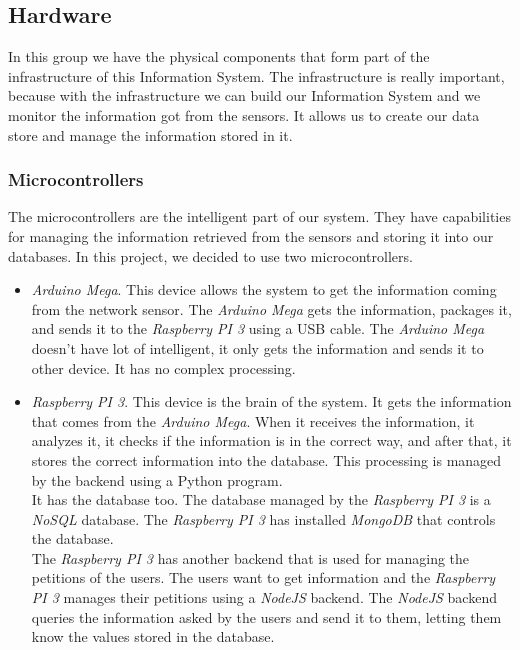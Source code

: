 \subsection{Hardware}

In this group we have the physical components that form part of the infrastructure of this Information System. The infrastructure is really important, because with the infrastructure we can build our Information System and we monitor the information got from the sensors. It allows us to create our data store and manage the information stored in it.

\subsubsection{Microcontrollers}

The microcontrollers are the intelligent part of our system. They have capabilities for managing the information retrieved from the sensors and storing it into our databases. In this project, we decided to use two microcontrollers.

\begin{itemize}

\item \textit{Arduino Mega}. This device allows the system to get the information coming from the network sensor. The \textit{Arduino Mega} gets the information, packages it, and sends it to the \textit{Raspberry PI 3} using a USB cable. The \textit{Arduino Mega} doesn't have lot of intelligent, it only gets the information and sends it to other device. It has no complex processing.\\

\item \textit{Raspberry PI 3}. This device is the brain of the system. It gets the information that comes from the \textit{Arduino Mega}. When it receives the information, it analyzes it, it checks if the information is in the correct way, and after that, it stores the correct information into the database. This processing is managed by the backend using a Python program.\\

It has the database too. The database managed by the \textit{Raspberry PI 3} is a \textit{NoSQL} database. The \textit{Raspberry PI 3} has installed \textit{MongoDB} that controls the database.\\

The \textit{Raspberry PI 3} has another backend that is used for managing the petitions of the users. The users want to get information and the \textit{Raspberry PI 3} manages their petitions using a \textit{NodeJS} backend. The \textit{NodeJS} backend queries the information asked by the users and send it to them, letting them know the values stored in the database.

\end{itemize}

